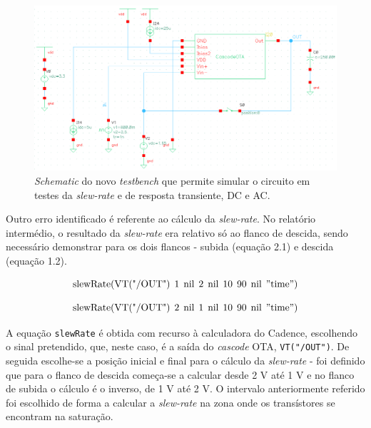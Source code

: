 \documentclass[11pt]{article}
\numberwithin{equation}{section}
\begin{document}
\begin{figure}[H]
	\centering
	\includegraphics[keepaspectratio=true, scale=0.50]{exps/testebenchantigo}
	\vspace{-0.5em}
	\caption{\textit{Schematic} do novo \textit{testbench} que permite simular o circuito em testes da \textit{slew-rate} e de resposta transiente, DC e AC.}
	\vspace{-0.8em}
\end{figure} 

Outro erro identificado é referente ao cálculo da \textit{slew-rate}. No relatório intermédio, o resultado da \textit{slew-rate} era relativo só ao flanco de descida, sendo necessário demonstrar para os dois flancos - subida (equação 2.1) e descida (equação 1.2). 

\vspace{-3mm}
\begin{equation}
	\text{slewRate} (\text{VT("/OUT")} \:\: 1 \:\: \text{nil} \:\: 2 \:\: \text{nil} \:\: 10 \:\: 90 \:\: \text{nil} \:\: "\text{time}")
\end{equation}

\vspace{-3mm}
\begin{equation}
	\text{slewRate} (\text{VT("/OUT")} \:\: 2 \:\: \text{nil} \:\: 1 \:\: \text{nil} \:\: 10 \:\: 90 \:\: \text{nil} \:\: "\text{time}")
\end{equation}

A equação \texttt{slewRate} é obtida com recurso à calculadora do Cadence, escolhendo o sinal pretendido, que, neste caso, é a saída do \textit{cascode} OTA, \texttt{VT("/OUT")}. De seguida escolhe-se a posição inicial e final para o cálculo da \textit{slew-rate} - foi definido que para o flanco de descida começa-se a calcular desde 2 V até 1 V e no flanco de subida o cálculo é o inverso, de 1 V até 2 V. O intervalo anteriormente referido foi escolhido de forma a calcular a \textit{slew-rate} na zona onde os transístores se encontram na saturação.
\end{document}

